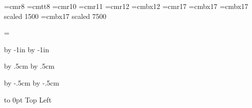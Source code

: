 






\vsize=210mm
\hsize=297mm






\nopagenumbers


\parindent=0pt

\font\small=cmr8
\font\smalltt=cmtt8
\font\medium=cmr10
\font\largemed=cmr11
\font\large=cmr12
\font\largebx=cmbx12
\font\Large=cmr17
\font\Largebx=cmbx17
\font\hugebx=cmbx17 scaled 1500
\font\Hugebx=cmbx17 scaled 7500

\let\numbercolor=\White






\headline={}

\advance\voffset by -1in
\advance\hoffset by -1in

\advance\voffset by .5cm
\advance\hoffset by .5cm

\advance\hsize by -.5cm
\advance\vsize by -.5cm


\nopagenumbers


\def\epsfsize#1#2{1.625#1}
\nopagenumbers

\baselineskip=0pt
\parskip=0pt

\vbox to 0pt{\vskip-8cm
\vss}
{\hugebx Top Left}
  


\bye




